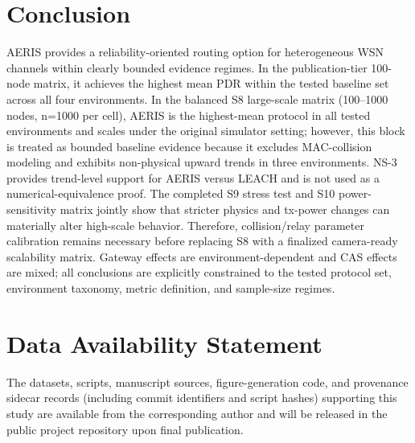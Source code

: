 \documentclass[sensors,article,submit,moreauthors,pdftex]{Definitions/mdpi}
\begin{document}
\section{Conclusion}
AERIS provides a reliability-oriented routing option for heterogeneous WSN channels within clearly bounded evidence regimes. In the publication-tier 100-node matrix, it achieves the highest mean PDR within the tested baseline set across all four environments. In the balanced S8 large-scale matrix (100--1000 nodes, n=1000 per cell), AERIS is the highest-mean protocol in all tested environments and scales under the original simulator setting; however, this block is treated as bounded baseline evidence because it excludes MAC-collision modeling and exhibits non-physical upward trends in three environments. NS-3 provides trend-level support for AERIS versus LEACH and is not used as a numerical-equivalence proof. The completed S9 stress test and S10 power-sensitivity matrix jointly show that stricter physics and tx-power changes can materially alter high-scale behavior. Therefore, collision/relay parameter calibration remains necessary before replacing S8 with a finalized camera-ready scalability matrix. Gateway effects are environment-dependent and CAS effects are mixed; all conclusions are explicitly constrained to the tested protocol set, environment taxonomy, metric definition, and sample-size regimes.

\section*{Data Availability Statement}
The datasets, scripts, manuscript sources, figure-generation code, and provenance sidecar records (including commit identifiers and script hashes) supporting this study are available from the corresponding author and will be released in the public project repository upon final publication.


\end{document}
